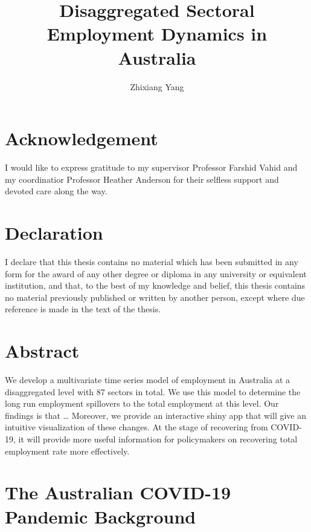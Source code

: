 \documentclass{monashthesis}
\author{Zhixiang Yang}
\title{Disaggregated Sectoral Employment Dynamics in Australia}
\begin{document}

\titlepage

{\sf\tighttoc\doublespacing}

\clearpage{}\setcounter{page}{0}

\graphicspath{ {/Users/elvisyang/Desktop/hon_proj/Disaggregated_Employment/Honours_thesis/figure} }

\hypertarget{acknowledgement}{%
\chapter*{Acknowledgement}\label{acknowledgement}}

I would like to express gratitude to my supervisor Professor Farshid Vahid and my coordinatior Professor Heather Anderson for their selfless support and devoted care along the way.

\hypertarget{declaration}{%
\chapter*{Declaration}\label{declaration}}

I declare that this thesis contains no material which has been submitted in any form for the award of any other degree or diploma in any university or equivalent institution, and that, to the best of my knowledge and belief, this thesis contains no material previously published or written by another person, except where due reference is made in the text of the thesis.

\hypertarget{abstract}{%
\chapter*{Abstract}\label{abstract}}

We develop a multivariate time series model of employment in Australia at a disaggregated level with 87 sectors in total. We use this model to determine the long run employment spillovers to the total employment at this level. Our findings is that \ldots{} Moreover, we provide an interactive shiny app that will give an intuitive visualization of these changes. At the stage of recovering from COVID-19, it will provide more useful information for policymakers on recovering total employment rate more effectively.

\hypertarget{the-australian-covid-19-pandemic-background}{%
\chapter{The Australian COVID-19 Pandemic Background}\label{the-australian-covid-19-pandemic-background}}
\end{document}
